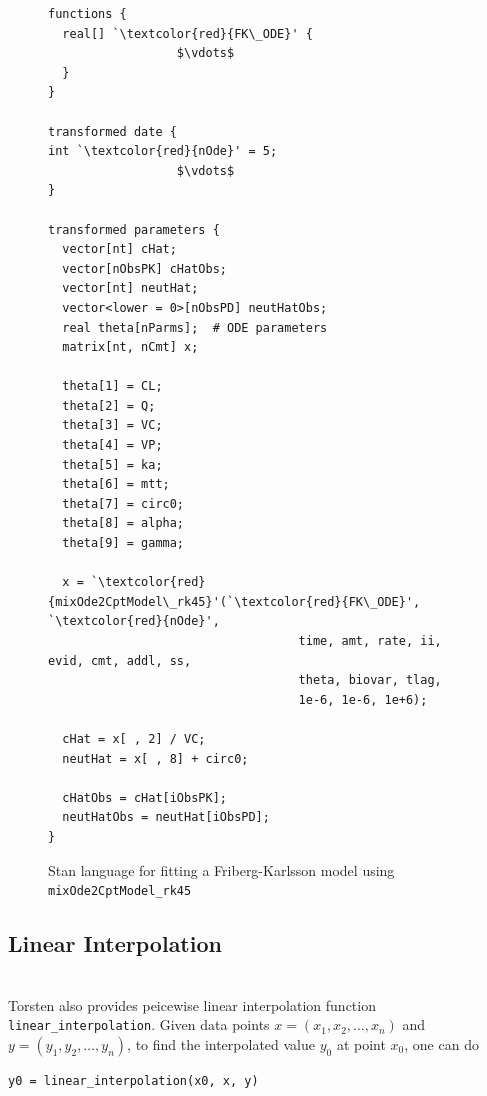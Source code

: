\documentclass[11pt]{amsart}
\newenvironment{fmpage}[1]
     {\begin{lrbox}{\fmbox}\begin{minipage}{#1}}
     {\end{minipage}\end{lrbox}\fbox{\usebox{\fmbox}}}
\begin{document}
\begin{figure}
\caption{Stan language for fitting a Friberg-Karlsson model using \texttt{mixOde2CptModel\_rk45}}
\begin{center}
\begin{small}
\begin{fmpage}{\textwidth - .75in}
\begin{lstlisting}[basicstyle=\footnotesize\ttfamily,mathescape=true,flexiblecolumns=true,frame=single,escapeinside=`']
functions {
  real[] `\textcolor{red}{FK\_ODE}' {
                  $\vdots$	
  }
}

transformed date {
int `\textcolor{red}{nOde}' = 5;
                  $\vdots$
}

transformed parameters {
  vector[nt] cHat;
  vector[nObsPK] cHatObs;
  vector[nt] neutHat;
  vector<lower = 0>[nObsPD] neutHatObs;
  real theta[nParms];  # ODE parameters
  matrix[nt, nCmt] x;
  
  theta[1] = CL;
  theta[2] = Q;
  theta[3] = VC;
  theta[4] = VP;
  theta[5] = ka;
  theta[6] = mtt;
  theta[7] = circ0;
  theta[8] = alpha;
  theta[9] = gamma;

  x = `\textcolor{red}{mixOde2CptModel\_rk45}'(`\textcolor{red}{FK\_ODE}', `\textcolor{red}{nOde}',
                                   time, amt, rate, ii, evid, cmt, addl, ss,
                                   theta, biovar, tlag,
                                   1e-6, 1e-6, 1e+6);

  cHat = x[ , 2] / VC;
  neutHat = x[ , 8] + circ0;

  cHatObs = cHat[iObsPK];
  neutHatObs = neutHat[iObsPD];
}
\end{lstlisting}
\end{fmpage}
\end{small}
\end{center}
\label{FK_mix2}
\end{figure}


\subsection{Linear Interpolation} \ \\
Torsten also provides peicewise linear interpolation function
\texttt{linear\_interpolation}. Given data points
$x = (x_1, x_2, \dots, x_n)$ and $y = (y_1, y_2, \dots,
y_n)$, to find the interpolated value $y_0$ at point
$x_0$, one can do

\begin{verbatim}
y0 = linear_interpolation(x0, x, y)
\end{verbatim}
\end{document}
